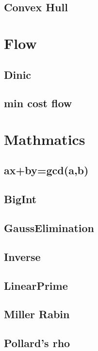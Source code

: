 \subsection{Convex Hull}


\section{Flow}

\subsection{Dinic}

\subsection{min cost flow}


\section{Mathmatics}

\subsection{ax+by=gcd(a,b)}

\subsection{BigInt}

\subsection{GaussElimination}

\subsection{Inverse}

\subsection{LinearPrime}

\subsection{Miller Rabin}

\subsection{Pollard's rho}


